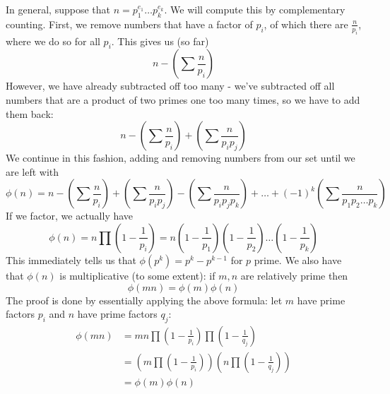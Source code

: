 In general, suppose that $n = p_1^{e_1} \ldots p_k^{e_k}$. We will compute this by complementary counting. First, we remove numbers that have a factor of $p_i$, of which there are $\frac{n}{p_i}$, where we do so for all $p_i$. This gives us (so far) 
\[
	n - \left(\sum \frac{n}{p_i} \right) 
\]
However, we have already subtracted off too many - we've subtracted off all numbers that are a product of two primes one too many times, so we have to add them back: 
\[
	n - \left(\sum \frac{n}{p_i} \right) + \left(\sum \frac{n}{p_i p_j} \right) 
\]
We continue in this fashion, adding and removing numbers from our set until we are left with 
\[
	\phi(n) = n - \left(\sum \frac{n}{p_i} \right) + \left(\sum \frac{n}{p_i p_j} \right) - \left(\sum \frac{n}{p_i p_j p_k} \right) + \ldots + (-1)^k \left(\sum \frac{n}{p_1 p_2 \ldots p_k} \right)
\]
If we factor, we actually have 
\[
\phi(n) = n\prod\left(1 - \frac{1}{p_i} \right) = n  \left(1 - \frac{1}{p_1} \right)\left(1 - \frac{1}{p_2} \right)\ldots \left(1 - \frac{1}{p_k} \right)
\]
This immediately tells us that $\phi(p^k) = p^k - p^{k-1}$ for $p$ prime. 
We also have that $\phi(n)$ is multiplicative (to some extent): if $m, n$ are relatively prime then 
\[
	\phi(mn) = \phi(m) \phi(n)
\]
The proof is done by essentially applying the above formula: let $m$ have prime factors $p_i$ and $n$ have prime factors $q_j$:  
\begin{align*}
    \phi(mn) &= mn \prod \left(1 - \frac{1}{p_i} \right) \prod \left(1 - \frac{1}{q_j} \right) \\
    &= \left(m\prod \left(1 - \frac{1}{p_i} \right)  \right) \left(n \prod \left(1 - \frac{1}{q_j} \right)  \right) \\
    &= \phi(m) \phi(n)
\end{align*}

